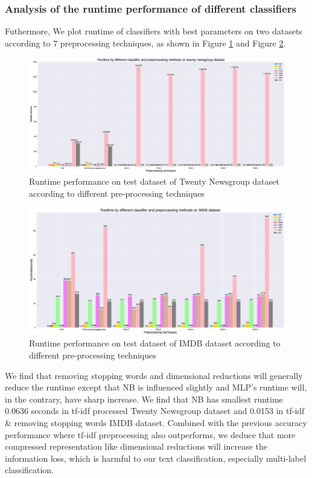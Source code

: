 \documentclass[11pt]{scrartcl}
\begin{document}
\subsubsection*{Analysis of the runtime performance of different classifiers}
Futhermore, We plot runtime of classifiers with best parameters on two datasets according to 7 preprocessing techniques, as shown in Figure \ref{runtime_20} and Figure \ref{runtime_imdb}.

\begin{figure}[H]
	\centering
	\includegraphics[width=\linewidth]{fig/model_runtime_20.eps}
	\caption{Runtime performance on test dataset of Twenty Newsgroup dataset according to different pre-processing techniques}
	\label{runtime_20}
\end{figure}

\begin{figure}[H]
	\centering
	\includegraphics[width=\linewidth]{fig/model_runtime_imdb.eps}
	\caption{Runtime performance on test dataset of IMDB dataset according to different pre-processing techniques}
	\label{runtime_imdb}
\end{figure}

We find that removing stopping words and dimensional reductions will generally reduce the runtime except that NB is influenced slightly and MLP's runtime will, in the contrary, have sharp increase. We find that NB has smallest runtime 0.0636 seconds in tf-idf processed Twenty Newsgroup dataset and 0.0153 in tf-idf \& removing stopping words IMDB dataset. Combined with the previous accuracy performance where tf-idf preprocessing also outperforms, we deduce that more compressed representation like dimensional reductions will increase the information loss, which is harmful to our text classification, especially multi-label classification.
\end{document}
